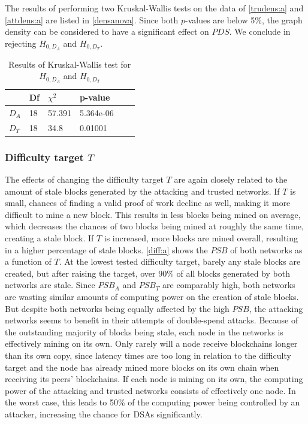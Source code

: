 \documentclass[a4paper,12pt,twoside]{report}
\begin{document}
The results of performing two Kruskal-Wallis tests on the data of \autoref{trudens:a} and \autoref{attdens:a} are listed in \autoref{densanova}. Since both $p$-values are below 5\%, the graph density can be considered to have a significant effect on $PDS$. We conclude in rejecting $H_{0,D_A}$ and $H_{0,D_T}$.
\begin{table}[h!]
\centering
\begin{tabular}{|l|l|l|l|l|l|} \hline
& Df & $\chi^{2}$ & p-value \\ \hline
$D_A$ & 18 &  57.391 & 5.364e-06 \\ \hline
$D_T$ & 18 & 34.8 & 0.01001 \\ \hline
\end{tabular}
\caption{Results of Kruskal-Wallis test for $H_{0,D_A}$ and $H_{0,D_T}$}
\label{densanova}
\end{table}

\subsubsection{Difficulty target $T$} \label{diffanalysis}
The effects of changing the difficulty target $T$ are again closely related to the amount of stale blocks generated by the attacking and trusted networks. If $T$ is small, chances of finding a valid proof of work decline as well, making it more difficult to mine a new block. This results in less blocks being mined on average, which decreases the chances of two blocks being mined at roughly the same time, creating a stale block. If $T$ is increased, more blocks are mined overall, resulting in a higher percentage of stale blocks. \autoref{diff:a} shows the $PSB$ of both networks as a function of $T$. At the lowest tested difficulty target, barely any stale blocks are created, but after raising the target, over 90\% of all blocks generated by both networks are stale. Since $PSB_A$ and $PSB_T$ are comparably high, both networks are wasting similar amounts of computing power on the creation of stale blocks. But despite both networks being equally affected by the high $PSB$, the attacking networks seems to benefit in their attempts of double-spend attacks. Because of the outstanding majority of blocks being stale, each node in the networks is effectively mining on its own. Only rarely will a node receive blockchains longer than its own copy, since latency times are too long in relation to the difficulty target and the node has already mined more blocks on its own chain when receiving its peers' blockchains. If each node is mining on its own, the computing power of the attacking and trusted networks consists of effectively one node. In the worst case, this leads to 50\% of the computing power being controlled by an attacker, increasing the chance for DSAs significantly.
\end{document}
